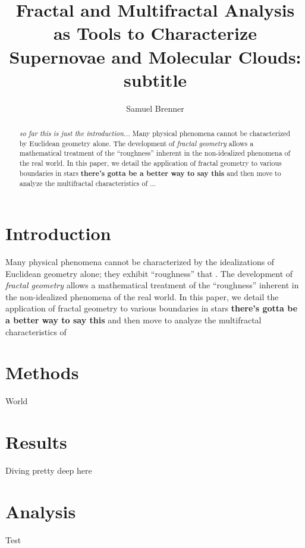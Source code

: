 \documentclass[iop]{emulateapj}
\begin{document}
%
\title{Fractal and Multifractal Analysis as Tools to Characterize Supernovae and Molecular Clouds: \\
subtitle}
%
\author{Samuel Brenner}
%
%
%
%
%
%
\begin{abstract}
\textit{so far this is just the introduction...} Many physical phenomena cannot be characterized by Euclidean geometry alone. The development of \textit{fractal geometry} allows a mathematical treatment of the ``roughness'' inherent in the non-idealized phenomena of the real world. In this paper, we detail the application of fractal geometry to various boundaries in stars \textbf{there's gotta be a better way to say this} and then move to analyze the multifractal characteristics of ...
\end{abstract}
%
%
%
%
%
%

\section{Introduction}
Many physical phenomena cannot be characterized by the idealizations of Euclidean geometry alone; they exhibit ``roughness'' that  . The development of \textit{fractal geometry} allows a mathematical treatment of the ``roughness'' inherent in the non-idealized phenomena of the real world. In this paper, we detail the application of fractal geometry to various boundaries in stars \textbf{there's gotta be a better way to say this} and then move to analyze the multifractal characteristics of 

\section{Methods}
World

\section{Results}
Diving pretty deep here

\section{Analysis}
Test
\end{document}
